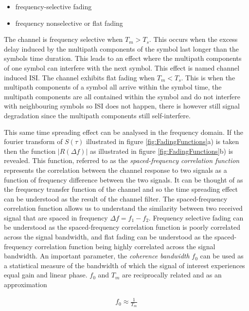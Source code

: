 \begin{itemize}
	\item{frequency-selective fading}
	\item{frequency nonselective or flat fading}
\end{itemize}

The channel is frequency selective when %
$T_{m} > T_{s}$. This occurs when the %
excess delay induced by the multipath %
components of the symbol last longer %
than the symbols time duration. This leads %
to an effect where the multipath components %
of one symbol can interfere with the next symbol. %
This effect is named channel induced ISI. The %
channel exhibits flat fading when %
$T_{m} < T_{s}$. This is when %
the multipath components of a symbol %
all arrive within the symbol time, the multipath %
components are all contained within the symbol and %
do not interfere with neighbouring symbols so ISI %
does not happen, there is however still signal %
degradation since the multipath components still %
self-interfere.

This same time spreading effect can be analysed in %
the frequency domain. If the fourier transform of %
$S(\tau)$ illustrated in figure \ref{fig:FadingFunctions}a) %
is taken then the function $\lvert %
R(\Delta f) \rvert$ as illustrated in figure %
\ref{fig:FadingFunctions}b) is revealed. This function, %
referred to as the \emph{spaced-frequency correlation %
function} represents the correlation between the channel %
response to two signals as a function of frequency %
difference between the two signals. It can be thought of %
as the frequency transfer function of the channel and so %
the time spreading effect can be understood as the result %
of the channel filter.
\FloatBarrier
The spaced-frequency correlation function allows us to %
understand the similarity between two received signal %
that are spaced in frequency $\Delta f = f_{1} - f_{2}$. %
Frequency selective fading can be understood as the %
spaced-frequency correlation function is poorly correlated %
across the signal bandwidth, and flat fading can be understood %
as the spaced-frequency correlation function being highly %
correlated across the signal bandwidth. An important %
parameter, the \emph{coherence bandwidth} $f_{0}$ %
can be used as a statistical measure of the bandwidth %
of which the signal of interest experiences equal gain %
and linear phase. $f_{0}$ and $T_{m}$ are reciprocally %
related and as an approximation

\begin{align}
	f_{0} \approx \frac{1}{T_{m}}
\end{align}

